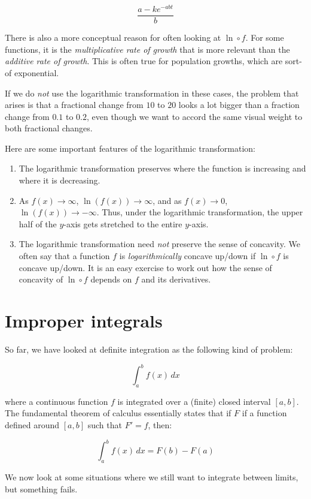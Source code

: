 \documentclass[10pt]{amsart}
\begin{document}
$$\frac{a - ke^{-abt}}{b}$$

There is also a more conceptual reason for often looking at $\ln \circ
f$. For some functions, it is the {\em multiplicative rate of growth}
that is more relevant than the {\em additive rate of growth}. This is
often true for population growths, which are sort-of exponential.

If we do {\em not} use the logarithmic transformation in these cases,
the problem that arises is that a fractional change from $10$ to $20$
looks a lot bigger than a fraction change from $0.1$ to $0.2$, even
though we want to accord the same visual weight to both fractional
changes.

Here are some important features of the logarithmic transformation:

\begin{enumerate}
\item The logarithmic transformation preserves where the function is
  increasing and where it is decreasing. 
\item As $f(x) \to \infty$, $\ln(f(x)) \to \infty$, and as $f(x) \to
  0$, $\ln(f(x)) \to -\infty$. Thus, under the logarithmic
  transformation, the upper half of the $y$-axis gets stretched to the
  entire $y$-axis.
\item The logarithmic transformation need {\em not} preserve the sense
  of concavity. We often say that a function $f$ is {\em
  logarithmically} concave up/down if $\ln \circ f$ is concave
  up/down. It is an easy exercise to work out how the sense of
  concavity of $\ln \circ f$ depends on $f$ and its derivatives.
\end{enumerate}

\section{Improper integrals}

So far, we have looked at definite integration as the following kind
of problem:

$$\int_a^b f(x) \, dx$$

where a continuous function $f$ is integrated over a (finite) closed
interval $[a,b]$. The fundamental theorem of calculus essentially
states that if $F$ if a function defined around $[a,b]$ such that $F'
= f$, then:

$$\int_a^b f(x) \, dx = F(b) - F(a)$$

We now look at some situations where we still want to integrate
between limits, but something fails.
\end{document}
